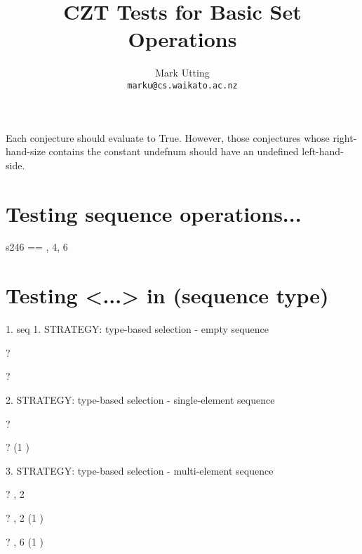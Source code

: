 \documentclass{article}
\title{CZT Tests for Basic Set Operations}
\author{Mark Utting \\ \texttt{marku@cs.waikato.ac.nz}}
\begin{document}
\maketitle

Each conjecture should evaluate to True.
However, those conjectures whose right-hand-size contains
the constant undefnum should have an undefined left-hand-side.


\section{Testing sequence operations...}

\begin{zed}
   s246 == , 4, 6 \rangle
\end{zed}

\section{Testing <...> in (sequence type)}
 1. seq
     1. STRATEGY: type-based selection - empty sequence 
\begin{zed} \vdash? \langle \rangle \infix \seq \nat \end{zed}
\begin{zed} \vdash? \langle \rangle \infix \seq \langle \rangle \end{zed}
     2. STRATEGY: type-based selection - single-element sequence
\begin{zed} \vdash?  \rangle \infix \seq \nat \end{zed}
\begin{zed} \vdash?  \rangle \infix \seq (1 ) \end{zed}
     3. STRATEGY: type-based selection - multi-element sequence
\begin{zed} \vdash? , 2 \rangle \infix \seq \nat \end{zed}
\begin{zed} \vdash? , 2 \rangle \infix \seq (1 ) \end{zed}
\begin{zed} \vdash? , 6 \rangle \notin \seq (1 ) \end{zed}
\end{document}
